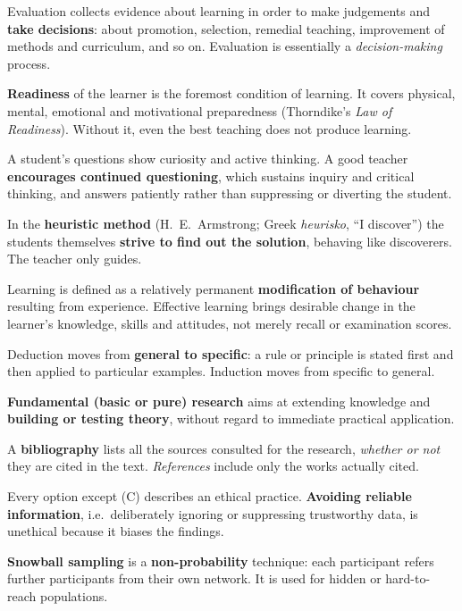 Evaluation collects evidence about learning in order to make judgements and \textbf{take decisions}: about promotion, selection, remedial teaching, improvement of methods and curriculum, and so on. Evaluation is essentially a \emph{decision-making} process.

\textbf{Readiness} of the learner is the foremost condition of learning. It covers physical, mental, emotional and motivational preparedness (Thorndike's \emph{Law of Readiness}). Without it, even the best teaching does not produce learning.

A student's questions show curiosity and active thinking. A good teacher \textbf{encourages continued questioning}, which sustains inquiry and critical thinking, and answers patiently rather than suppressing or diverting the student.

In the \textbf{heuristic method} (H.~E.~Armstrong; Greek \emph{heurisko}, ``I discover'') the students themselves \textbf{strive to find out the solution}, behaving like discoverers. The teacher only guides.

Learning is defined as a relatively permanent \textbf{modification of behaviour} resulting from experience. Effective learning brings desirable change in the learner's knowledge, skills and attitudes, not merely recall or examination scores.

Deduction moves from \textbf{general to specific}: a rule or principle is stated first and then applied to particular examples. Induction moves from specific to general.

\textbf{Fundamental (basic or pure) research} aims at extending knowledge and \textbf{building or testing theory}, without regard to immediate practical application.

A \textbf{bibliography} lists all the sources consulted for the research, \emph{whether or not} they are cited in the text. \emph{References} include only the works actually cited.

Every option except (C) describes an ethical practice. \textbf{Avoiding reliable information}, i.e.\ deliberately ignoring or suppressing trustworthy data, is unethical because it biases the findings.

\textbf{Snowball sampling} is a \textbf{non-probability} technique: each participant refers further participants from their own network. It is used for hidden or hard-to-reach populations.

